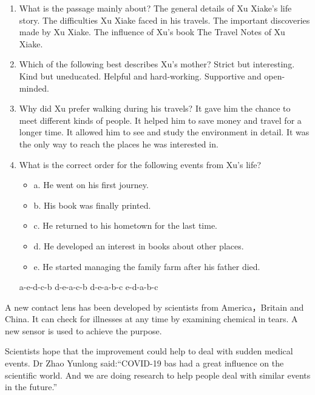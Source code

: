 \documentclass{ExamJHSEngl}
\begin{document}
\begin{enumerate}[resume,ref={\arabic*},labelsep=-0.1em]

  \item[\choice{A}] What is the passage mainly about?
  \options
    {The general details  of Xu Xiake’s life story.}
    {The difficulties Xu Xiake faced in his travels.}
    {The important discoveries made by Xu Xiake.}
    {The influence of Xu's book The Travel Notes of Xu Xiake.}

  \item[\choice{D}] Which of the following best describes Xu's mother? 
  \options
    {Strict but interesting.}
    {Kind but uneducated.}
    {Helpful and hard-working.}
    {Supportive and open-minded. }

  \item[\choice{C}] Why did Xu prefer walking during his travels?
  \options
    {It gave him the chance to meet different kinds of people.}
    {It helped him to save money and travel for a longer time.}
    {It allowed him to see and study the environment in detail.}
    {It was the only way to reach the places he was interested in.}

  \item[\choice{B}] What is the correct order for the following events from Xu's life?

  \begin{itemize}[label={}]
    \item a. He went on his first journey.
    \item b. His book was finally printed.
    \item c. He returned to his hometown for the last time.
    \item d. He developed an interest in books about other places.
    \item e. He started managing the family farm after his father died. 
  \end{itemize}
  \options
    {a-e-d-c-b}
    {d-e-a-c-b}
    {d-e-a-b-c}
    {e-d-a-b-c}

\end{enumerate}


A new contact lens  has been developed by scientists from America，Britain and China. It can check for illnesses at any time by examining chemical in tears. A new sensor  is used to achieve the purpose.

Scientists hope that the improvement could help to deal with sudden medical events. Dr Zhao Yunlong said:“COVID-19 bas had a great influence on the scientific world. And we are doing research to help people deal with similar events in the future.”
\end{document}
